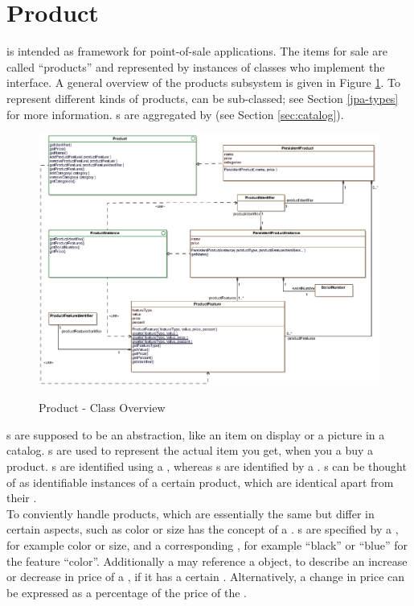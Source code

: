 \section{Product}
\label{sec:product}
\salespoint{} is intended as framework for point-of-sale applications.
The items for sale are called ``products'' and represented by instances of classes who implement the  interface.
A general overview of the \salespoint{} products subsystem is given in Figure \ref{product_overview}.
To represent different kinds of products,  can be sub-classed; see Section \ref{jpa-types} for more information.
s are aggregated by  (see Section \ref{sec:catalog}).

\begin{figure}[h]
	\centering
  \includegraphics[width=1.0\textwidth]{images/Product_Overview.eps}
	\label{product_overview}
	\caption{Product - Class Overview}
\end{figure}

s are supposed to be an abstraction, like an item on display or a picture in a catalog.
s are used to represent the actual item you get, when you a buy a product.
s are identified using a , whereas s are identified by a .
s can be thought of as identifiable instances of a certain product, which are identical apart from their .
\\

To conviently handle products, which are essentially the same but differ in certain aspects, such as color or size \salespoint{} has the concept of a .
s are specified by a , for example color or size, and a corresponding , for example ``black'' or ``blue'' for the feature ``color''.
Additionally a  may reference a  object, to describe an increase or decrease in price of a , if it has a certain .
Alternatively, a change in price can be expressed as a percentage of the price of the .

